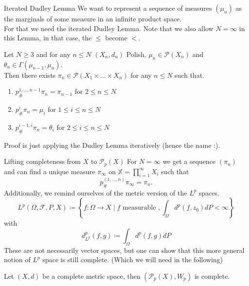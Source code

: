 \documentclass[10pt]{beamer}
\begin{document}
\begin{frame}{Iterated Dudley Lemma}
    We want to represent a sequence of measures $(\mu_n)$ as the marginals of some measure in an infinite product space. \\ 
    \vspace{0.5cm}
    For that we need the iterated Dudley Lemma. Note that we also allow $N = \infty$ in this Lemma, in that case, the $\leq$ become $<$.
    \begin{lemma}
        Let $N \geq 3$ and for any $n \leq N$ $(X_n,d_n)$ Polish, $\mu_n \in \mathcal{P}(X_n)$ and $\theta_n \in \Gamma(\mu_{n-1},\mu_n)$. \\ 
        Then there exists $\pi_n \in \mathcal{P}(X_1\times ... \times X_n)$ for any $n \leq N$ such that.
        \begin{enumerate}
            \item $p^{1,...,n-1}_{\#} \pi_n = \pi_{n-1}$ for $2 \leq n \leq N$
            \item $p^i_{\#} \pi_n = \mu_i$ for $1 \leq i \leq n \leq N$
            \item $p^{i-1,i}_{\#} \pi_n = \theta_i$ for $2 \leq i\leq n \leq N$
        \end{enumerate}
    \end{lemma}
    Proof is just applying the Dudley Lemma iteratively (hence the name :).
\end{frame}

\begin{frame}{Lifting completeness from $X$ to $\mathcal{P}_p(X)$}
    For $N=\infty$ we get a sequence $(\pi_n)$ and can find a unique measure $\pi_\infty$ on $\mathbb{X} = \prod_{i = 1}^\infty X_i$ such that $$p^{(1,...,n)}_{\#} \pi_\infty = \pi_n.$$
    Additionally, we remind ourselves of the metric version of the $L^p$ spaces. 
        $$L^p(\Omega,\mathcal{F}, P, X) \coloneqq \left\{ f : \Omega \rightarrow X \mid f \text{ measurable }, \int_\Omega d^p(f,z_0) d P < \infty \right\}$$ with$$d_{L^p}^p(f,g) \coloneqq \int_\Omega d^p(f,g) dP$$
        These are not necessarily vector spaces, but one can show that this more general notion of $L^p$ space is still complete. (Which we will need in the following)
    \begin{theorem}
        Let $(X,d)$ be a complete metric space, then $(\mathcal{P}_p(X), W_p)$ is complete.
    \end{theorem}
\end{frame}


\end{document}
